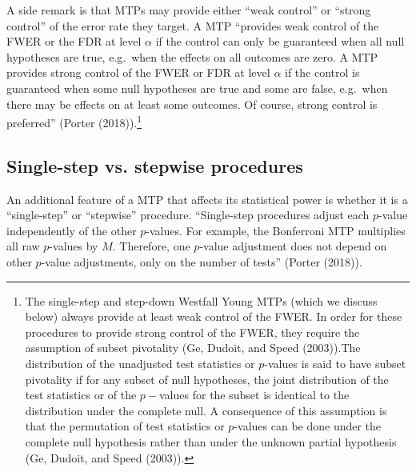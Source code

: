 \documentclass[
]{article}
\begin{document}
A side remark is that MTPs may provide either ``weak control'' or
``strong control'' of the error rate they target. A MTP ``provides weak
control of the FWER or the FDR at level \(\alpha\) if the control can
only be guaranteed when all null hypotheses are true, e.g.~when the
effects on all outcomes are zero. A MTP provides strong control of the
FWER or FDR at level \(\alpha\) if the control is guaranteed when some
null hypotheses are true and some are false, e.g.~when there may be
effects on at least some outcomes. Of course, strong control is
preferred'' (Porter (2018)).\footnote{The single-step and step-down
  Westfall Young MTPs (which we discuss below) always provide at least
  weak control of the FWER. In order for these procedures to provide
  strong control of the FWER, they require the assumption of subset
  pivotality (Ge, Dudoit, and Speed (2003)).The distribution of the
  unadjusted test statistics or \(p\)-values is said to have subset
  pivotality if for any subset of null hypotheses, the joint
  distribution of the test statistics or of the \(p-\)values for the
  subset is identical to the distribution under the complete null. A
  consequence of this assumption is that the permutation of test
  statistics or \(p\)-values can be done under the complete null
  hypothesis rather than under the unknown partial hypothesis (Ge,
  Dudoit, and Speed (2003)).}

\subsection{Single-step vs. stepwise procedures}
\label{sec:stepwise}

An additional feature of a MTP that affects its statistical power is
whether it is a ``single-step'' or ``stepwise'' procedure. ``Single-step
procedures adjust each \(p\)-value independently of the other
\(p\)-values. For example, the Bonferroni MTP multiplies all raw
\(p\)-values by \(M\). Therefore, one \(p\)-value adjustment does not
depend on other \(p\)-value adjustments, only on the number of tests''
(Porter (2018)).
\end{document}
